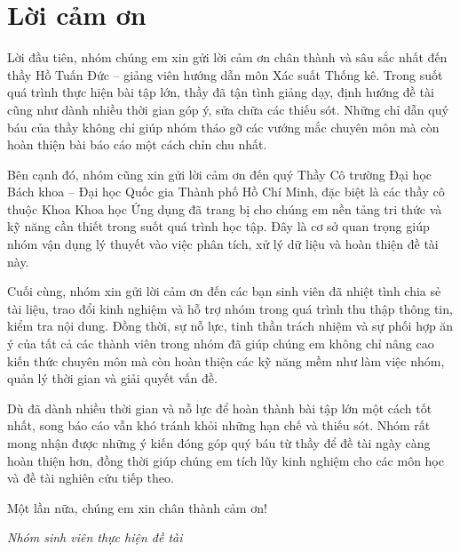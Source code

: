 \documentclass[12pt,a4paper]{article}
\begin{document}
\newpage
\section*{Lời cảm ơn}

Lời đầu tiên, nhóm chúng em xin gửi lời cảm ơn chân thành và sâu sắc nhất đến thầy
Hồ Tuấn Đức -- giảng viên hướng dẫn môn Xác suất Thống kê. Trong suốt quá trình thực hiện
bài tập lớn, thầy đã tận tình giảng dạy, định hướng đề tài cũng như dành nhiều thời gian góp
ý, sửa chữa các thiếu sót. Những chỉ dẫn quý báu của thầy không chỉ giúp nhóm tháo gỡ các
vướng mắc chuyên môn mà còn hoàn thiện bài báo cáo một cách chỉn chu nhất.

Bên cạnh đó, nhóm cũng xin gửi lời cảm ơn đến quý Thầy Cô trường Đại học Bách khoa -- Đại học
Quốc gia Thành phố Hồ Chí Minh, đặc biệt là các thầy cô thuộc Khoa Khoa học Ứng dụng đã trang
bị cho chúng em nền tảng tri thức và kỹ năng cần thiết trong suốt quá trình học tập. Đây là
cơ sở quan trọng giúp nhóm vận dụng lý thuyết vào việc phân tích, xử lý dữ liệu và hoàn thiện
đề tài này.

Cuối cùng, nhóm xin gửi lời cảm ơn đến các bạn sinh viên đã nhiệt tình chia sẻ tài liệu, trao
đổi kinh nghiệm và hỗ trợ nhóm trong quá trình thu thập thông tin, kiểm tra nội dung. Đồng
thời, sự nỗ lực, tinh thần trách nhiệm và sự phối hợp ăn ý của tất cả các thành viên trong
nhóm đã giúp chúng em không chỉ nâng cao kiến thức chuyên môn mà còn hoàn thiện các kỹ năng
mềm như làm việc nhóm, quản lý thời gian và giải quyết vấn đề.

Dù đã dành nhiều thời gian và nỗ lực để hoàn thành bài tập lớn một cách tốt nhất, song báo
cáo vẫn khó tránh khỏi những hạn chế và thiếu sót. Nhóm rất mong nhận được những ý kiến đóng
góp quý báu từ thầy để đề tài ngày càng hoàn thiện hơn, đồng thời giúp chúng em tích lũy kinh
nghiệm cho các môn học và đề tài nghiên cứu tiếp theo.

Một lần nữa, chúng em xin chân thành cảm ơn!

\begin{flushright}
\textit{Nhóm sinh viên thực hiện đề tài}
\end{flushright}

\newpage
\tableofcontents
\newpage
{}
\listoftables
\newpage
{}
\listoffigures
\newpage

\setcounter{page}{1}
\end{document}
